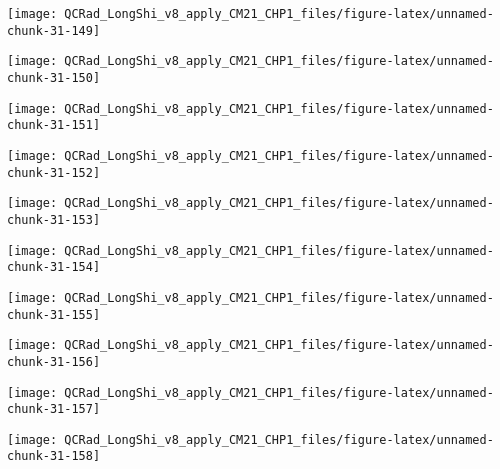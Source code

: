 \documentclass[
  10pt,
  a4paper,oneside]{article}
\begin{document}
\begin{center}\texttt{[image: QCRad\_LongShi\_v8\_apply\_CM21\_CHP1\_files/figure-latex/unnamed-chunk-31-149]} \end{center}

\begin{center}\texttt{[image: QCRad\_LongShi\_v8\_apply\_CM21\_CHP1\_files/figure-latex/unnamed-chunk-31-150]} \end{center}

\begin{center}\texttt{[image: QCRad\_LongShi\_v8\_apply\_CM21\_CHP1\_files/figure-latex/unnamed-chunk-31-151]} \end{center}

\begin{center}\texttt{[image: QCRad\_LongShi\_v8\_apply\_CM21\_CHP1\_files/figure-latex/unnamed-chunk-31-152]} \end{center}

\begin{center}\texttt{[image: QCRad\_LongShi\_v8\_apply\_CM21\_CHP1\_files/figure-latex/unnamed-chunk-31-153]} \end{center}

\begin{center}\texttt{[image: QCRad\_LongShi\_v8\_apply\_CM21\_CHP1\_files/figure-latex/unnamed-chunk-31-154]} \end{center}

\begin{center}\texttt{[image: QCRad\_LongShi\_v8\_apply\_CM21\_CHP1\_files/figure-latex/unnamed-chunk-31-155]} \end{center}

\begin{center}\texttt{[image: QCRad\_LongShi\_v8\_apply\_CM21\_CHP1\_files/figure-latex/unnamed-chunk-31-156]} \end{center}

\begin{center}\texttt{[image: QCRad\_LongShi\_v8\_apply\_CM21\_CHP1\_files/figure-latex/unnamed-chunk-31-157]} \end{center}

\begin{center}\texttt{[image: QCRad\_LongShi\_v8\_apply\_CM21\_CHP1\_files/figure-latex/unnamed-chunk-31-158]} \end{center}
\end{document}
